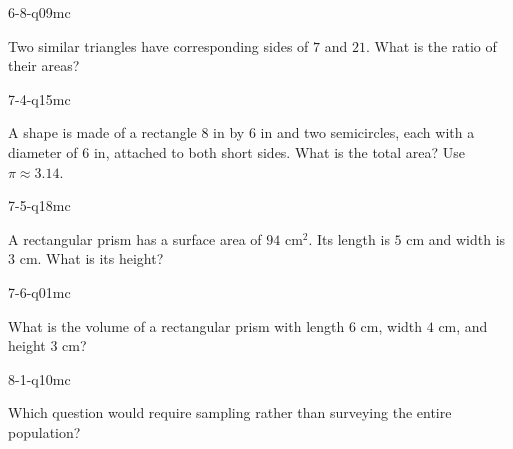 \begin{practiceQuestion}{6-8-q09}{mc}
\begin{questionText}
Two similar triangles have corresponding sides of $7$ and $21$. What is the ratio of their areas?
\end{questionText}
\end{practiceQuestion}

\begin{practiceQuestion}{7-4-q15}{mc}
\begin{questionText}
A shape is made of a rectangle $8$ in by $6$ in and two semicircles, each with a diameter of $6$ in, attached to both short sides. What is the total area? Use $\pi \approx 3.14$.
\end{questionText}
\end{practiceQuestion}

\begin{practiceQuestion}{7-5-q18}{mc}
\begin{questionText}
A rectangular prism has a surface area of $94$ cm$^2$. Its length is $5$ cm and width is $3$ cm. What is its height?
\end{questionText}
\end{practiceQuestion}

\begin{practiceQuestion}{7-6-q01}{mc}
\begin{questionText}
What is the volume of a rectangular prism with length $6$ cm, width $4$ cm, and height $3$ cm?
\end{questionText}
\end{practiceQuestion}

\begin{practiceQuestion}{8-1-q10}{mc}
\begin{questionText}
Which question would require sampling rather than surveying the entire population?
\end{questionText}
\end{practiceQuestion}

